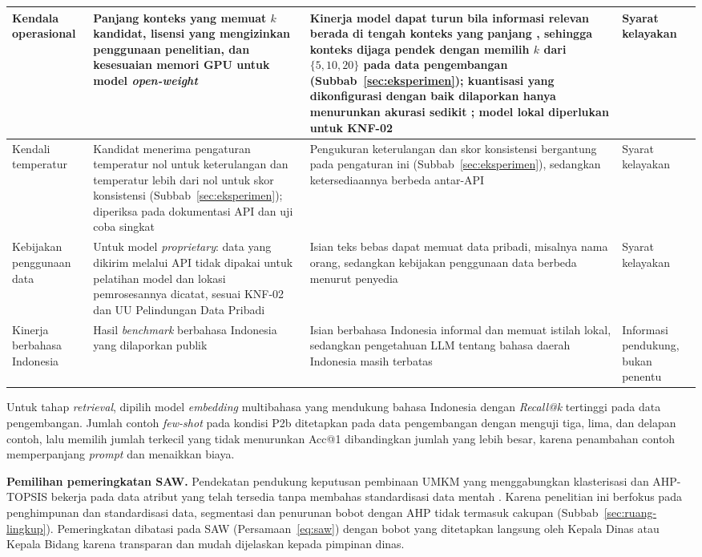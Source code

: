 {\begin{longtable}{|L{0.13\textwidth}|L{0.31\textwidth}|L{0.30\textwidth}|L{0.15\textwidth}|}
Kendala operasional & Panjang konteks yang memuat $k$ kandidat, lisensi yang mengizinkan penggunaan penelitian, dan kesesuaian memori GPU untuk model \textit{open-weight} & Kinerja model dapat turun bila informasi relevan berada di tengah konteks yang panjang \cite{liu2024lost}, sehingga konteks dijaga pendek dengan memilih $k$ dari $\{5, 10, 20\}$ pada data pengembangan (Subbab~\ref{sec:eksperimen}); kuantisasi yang dikonfigurasi dengan baik dilaporkan hanya menurunkan akurasi sedikit \cite{kurtic2025bf16}; model lokal diperlukan untuk KNF-02 & Syarat kelayakan \\ \hline
Kendali temperatur & Kandidat menerima pengaturan temperatur nol untuk keterulangan dan temperatur lebih dari nol untuk skor konsistensi (Subbab~\ref{sec:eksperimen}); diperiksa pada dokumentasi API dan uji coba singkat & Pengukuran keterulangan dan skor konsistensi bergantung pada pengaturan ini (Subbab~\ref{sec:eksperimen}), sedangkan ketersediaannya berbeda antar-API & Syarat kelayakan \\ \hline
Kebijakan penggunaan data & Untuk model \textit{proprietary}: data yang dikirim melalui API tidak dipakai untuk pelatihan model dan lokasi pemrosesannya dicatat, sesuai KNF-02 dan UU Pelindungan Data Pribadi \cite{uupdp2022} & Isian teks bebas dapat memuat data pribadi, misalnya nama orang, sedangkan kebijakan penggunaan data berbeda menurut penyedia & Syarat kelayakan \\ \hline
Kinerja berbahasa Indonesia & Hasil \textit{benchmark} berbahasa Indonesia yang dilaporkan publik \cite{cahyawijaya2024cendol} & Isian berbahasa Indonesia informal dan memuat istilah lokal, sedangkan pengetahuan LLM tentang bahasa daerah Indonesia masih terbatas \cite{koto2023indommlu} & Informasi pendukung, bukan penentu \\ \hline
\end{longtable}
}

Untuk tahap \textit{retrieval}, dipilih model \textit{embedding} multibahasa yang mendukung bahasa Indonesia dengan \textit{Recall@k} tertinggi pada data pengembangan. Jumlah contoh \textit{few-shot} pada kondisi P2b ditetapkan pada data pengembangan dengan menguji tiga, lima, dan delapan contoh, lalu memilih jumlah terkecil yang tidak menurunkan Acc@1 dibandingkan jumlah yang lebih besar, karena penambahan contoh memperpanjang \textit{prompt} dan menaikkan biaya.

\textbf{Pemilihan pemeringkatan SAW.} Pendekatan pendukung keputusan pembinaan UMKM yang menggabungkan klasterisasi dan AHP-TOPSIS bekerja pada data atribut yang telah tersedia tanpa membahas standardisasi data mentah \cite{khotimah2024hybrid}. Karena penelitian ini berfokus pada penghimpunan dan standardisasi data, segmentasi dan penurunan bobot dengan AHP tidak termasuk cakupan (Subbab~\ref{sec:ruang-lingkup}). Pemeringkatan dibatasi pada SAW (Persamaan~\eqref{eq:saw}) dengan bobot yang ditetapkan langsung oleh Kepala Dinas atau Kepala Bidang karena transparan dan mudah dijelaskan kepada pimpinan dinas.


